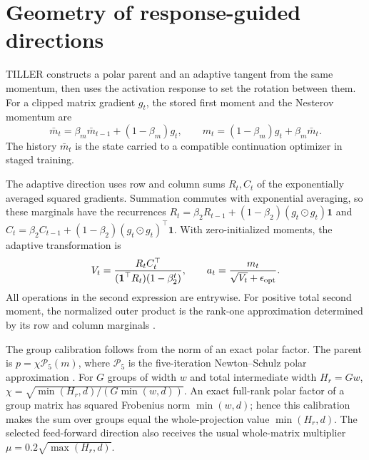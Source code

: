 \section{Geometry of response-guided directions}
\label{sec:directions}

TILLER constructs a polar parent and an adaptive tangent from the
same momentum, then uses the activation response to set the rotation
between them. For a clipped matrix gradient $g_t$, the stored
first moment and the Nesterov momentum are
\[
 \bar m_t=\beta_m\bar m_{t-1}+(1-\beta_m)g_t,\qquad
 m_t=(1-\beta_m)g_t+\beta_m\bar m_t.
\]
The history $\bar m_t$ is the state carried to a compatible
continuation optimizer in staged training.

The adaptive direction uses row and column sums $R_t,C_t$ of the
exponentially averaged squared gradients. Summation commutes with
exponential averaging, so these marginals have the recurrences
$R_t=\beta_2R_{t-1}+(1-\beta_2)(g_t\odot g_t)\boldsymbol1$ and
$C_t=\beta_2C_{t-1}+(1-\beta_2)(g_t\odot g_t)^\top\boldsymbol1$.
With zero-initialized moments, the adaptive transformation is
\begin{equation}
 V_t=\frac{R_tC_t^\top}{(\boldsymbol1^\top R_t)(1-\beta_2^t)},
 \qquad a_t=\frac{m_t}{\sqrt{V_t}+\epsilon_{\rm opt}}.
 \label{eq:factored-direction}
\end{equation}
All operations in the second expression are entrywise. For positive
total second moment, the normalized outer product is the rank-one
approximation determined by its row and column marginals
\citep{shazeer2018adafactor}.

The group calibration follows from the norm of an exact polar factor.
The parent is $p=\chi\mathcal P_5(m)$, where $\mathcal P_5$ is the
five-iteration Newton--Schulz polar approximation
\citep{jordan2024muon,liu2025muon}. For $G$ groups of width $w$
and total intermediate width $H_r=Gw$,
$\chi=\sqrt{\min(H_r,d)/(G\min(w,d))}$.
An exact full-rank polar factor of a group matrix has squared
Frobenius norm $\min(w,d)$; hence this calibration makes the sum
over groups equal the whole-projection value $\min(H_r,d)$.
The selected feed-forward direction also receives the usual
whole-matrix multiplier $\mu=0.2\sqrt{\max(H_r,d)}$.

